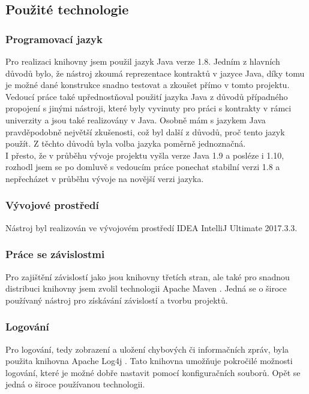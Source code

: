 	    \subsection{Použité technologie}
	    
	    	\subsubsection{Programovací jazyk}
				Pro realizaci knihovny jsem použil jazyk Java verze 1.8. Jedním z hlavních důvodů bylo, že nástroj zkoumá reprezentace kontraktů v jazyce Java, díky tomu je možné dané konstrukce snadno testovat a zkoušet přímo v tomto projektu. Vedoucí práce také upřednostňoval použití jazyka Java z důvodů případného propojení s jinými nástroji, které byly vyvinuty pro práci s kontrakty v rámci univerzity a jsou také realizovány v Java. Osobně mám s jazykem Java pravděpodobně největší zkušenosti, což byl další z důvodů, proč tento jazyk použít. Z těchto důvodů byla volba jazyka poměrně jednoznačná.\\
				
				I přesto, že v průběhu vývoje projektu vyšla verze Java 1.9 a posléze i 1.10, rozhodl jsem se po domluvě s vedoucím práce ponechat stabilní verzi 1.8 a nepřecházet v průběhu vývoje na novější verzi jazyka.
				
			\subsubsection{Vývojové prostředí}				
				Nástroj byl realizován ve vývojovém prostředí IDEA IntelliJ Ultimate 2017.3.3.
	    	
			\subsubsection{Práce se závislostmi}
				Pro zajištění závislostí jako jsou knihovny třetích stran, ale také pro snadnou distribuci knihovny jsem zvolil technologii Apache Maven \cite{maven}. Jedná se o široce používaný nástroj pro získávání závislostí a tvorbu projektů.
				
			\subsubsection{Logování}
				Pro logování, tedy zobrazení a uložení chybových či informačních zpráv, byla použita knihovna Apache Log4j \cite{log4j}. Tato knihovna umožňuje pokročilé možnosti logování, které je možné dobře nastavit pomocí konfiguračních souborů. Opět se jedná o široce používanou technologii.
				
